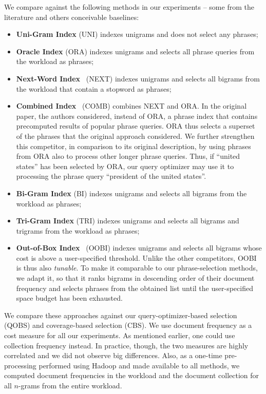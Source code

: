 We compare against the following methods in our
experiments -- some from the literature and others conceivable
baselines:
\begin{itemize}

\item{\textbf{Uni-Gram Index}} (UNI) indexes unigrams and does not
  select any phrases;

\item{\textbf{Oracle Index}} (ORA) indexes unigrams and selects all
  phrase queries from the workload as phrases;

\item{\textbf{Next-Word Index}}~\cite{Williams:2004fk} (NEXT) indexes
  unigrams and selects all bigrams from the workload that contain a
  stopword as phrases;

\item{\textbf{Combined Index}}~\cite{Williams:2004fk} (COMB) combines
  NEXT and ORA. In the original paper, the authors considered, instead
  of ORA, a phrase index that contains precomputed results of popular
  phrase queries. ORA thus selects a superset of the phrases that the
  original approach considered. We further strengthen this competitor,
  in comparison to its original description, by using phrases from ORA
  also to process other longer phrase queries. Thus, if
  \textsf{``united states''} has been selected by ORA, our query
  optimizer may use it to processing the phrase query
  \textsf{``president of the united states''}.

\item{\textbf{Bi-Gram Index}} (BI) indexes unigrams and selects
  all bigrams from the workload as phrases;

\item{\textbf{Tri-Gram Index}} (TRI) indexes unigrams and selects all
  bigrams and trigrams from the workload as phrases;

\item{\textbf{Out-of-Box Index}}~\cite{Transier:2008kx} (OOBI) indexes
  unigrams and selects all bigrams whose cost is above a
  user-specified threshold. Unlike the other competitors, OOBI is thus
  also \emph{tunable}. To make it comparable to our phrase-selection
  methods, we adapt it, so that it ranks bigrams in descending order
  of their document frequency and selects phrases from the obtained
  list until the user-specified space budget has been exhausted.

\end{itemize}

We compare these approaches against our query-optimizer-based
selection (QOBS) and coverage-based selection (CBS). We use document
frequency as a cost measure for all our experiments. As mentioned
earlier, one could use collection frequency instead. In practice,
though, the two measures are highly correlated and we did not observe
big differences. Also, as a one-time pre-processing performed using
Hadoop and made available to all methods, we computed document
frequencies in the workload and the document collection for all
$n$-grams from the entire workload.

